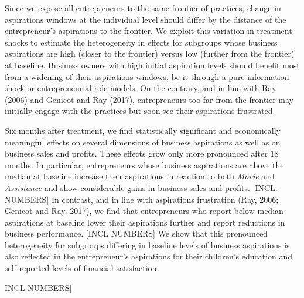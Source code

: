 \documentclass[11.5pt]{article}
\begin{document}
Since we expose all entrepreneurs to the same frontier of practices, change in aspirations windows at the individual level should differ by the distance of the entrepreneur's aspirations to the frontier. We exploit this variation in treatment shocks to estimate the heterogeneity in effects for subgroups whose business aspirations are high (closer to the frontier) versus low (further from the frontier) at baseline. Business owners with high initial aspiration levels should benefit most from a widening of their aspirations windows, be it through a pure information shock or entrepreneurial role models. On the contrary, and in line with Ray (2006) and Genicot and Ray (2017), entrepreneurs too far from the frontier may initially engage with the practices but soon see their aspirations frustrated. 

Six months after treatment, we find statistically significant and economically meaningful effects on several dimensions of business aspirations as well as on business sales and profits. These effects grow only more pronounced after 18 months. In particular, entrepreneurs whose business aspirations are above the median at baseline increase their aspirations in reaction to both \emph{Movie} and \emph{Assistance} and show considerable gains in business sales and profits. [INCL. NUMBERS] In contrast, and in line with aspirations frustration (Ray, 2006; Genicot and Ray, 2017), we find that entrepreneurs who report below-median aspirations at baseline lower their aspirations further and report reductions in business performance. [INCL NUMBERS] We show that this pronounced heterogeneity for subgroups differing in baseline levels of business aspirations is also reflected in the entrepreneur's aspirations for their children's education and self-reported levels of financial satisfaction. {INCL NUMBERS]

}
\end{document}
